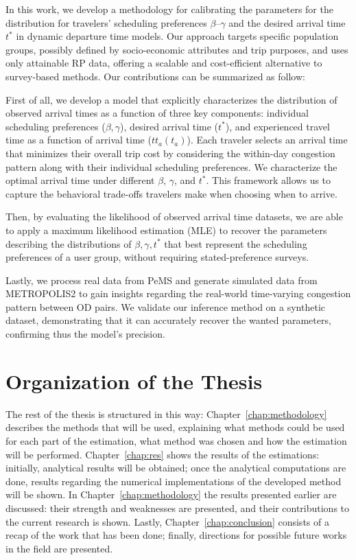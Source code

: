 
In this work, we develop a methodology for calibrating the parameters for the distribution for travelers' scheduling preferences \(\beta\)–\(\gamma\) and the desired arrival time \( t^* \) in dynamic departure time models. Our approach targets specific population groups, possibly defined by socio-economic attributes and trip purposes, and uses only attainable RP data, offering a scalable and cost-efficient alternative to survey-based methods.
Our contributions can be summarized as follow:

First of all, we develop a model that explicitly characterizes the distribution of observed arrival times as a function of three key components: individual scheduling preferences (\(\beta, \gamma\)), desired arrival time (\(t^*\)), and experienced travel time as a function of arrival time (\(tt_a(t_a)\)). Each traveler selects an arrival time that minimizes their overall trip cost by considering the within-day congestion pattern along with their individual scheduling preferences. We characterize the optimal arrival time under different $\beta$, $\gamma$, and $t^*$. This framework allows us to capture the behavioral trade-offs travelers make when choosing when to arrive.

Then, by evaluating the likelihood of observed arrival time datasets, we are able to apply a maximum likelihood estimation (MLE) to recover the parameters describing the distributions of \(\beta, \gamma, t^*\) that best represent the scheduling preferences of a user group, without requiring stated-preference surveys.

Lastly, we process real data from PeMS and generate simulated data from METROPOLIS2 to gain insights regarding the real-world time-varying congestion pattern between OD pairs.  We validate our inference method on a synthetic dataset, demonstrating that it can accurately recover the wanted parameters, confirming thus the model's precision.


\section{Organization of the Thesis}
The rest of the thesis is structured in this way:
Chapter~\ref{chap:methodology} describes the methods that will be used,
explaining what methods could be used for each part of the estimation,
what method was chosen and how the estimation will be performed.
Chapter~\ref{chap:res} shows the results of the estimations:
initially, analytical results will be obtained;
once the analytical computations are done,
results regarding the numerical implementations of the developed method will be shown.
In Chapter~\ref{chap:methodology} the results presented earlier are discussed:
their strength and weaknesses are presented,
and their contributions to the current research is shown.
Lastly, Chapter~\ref{chap:conclusion} consists of a recap of the work that has been done;
finally, directions for possible future works in the field are presented.


